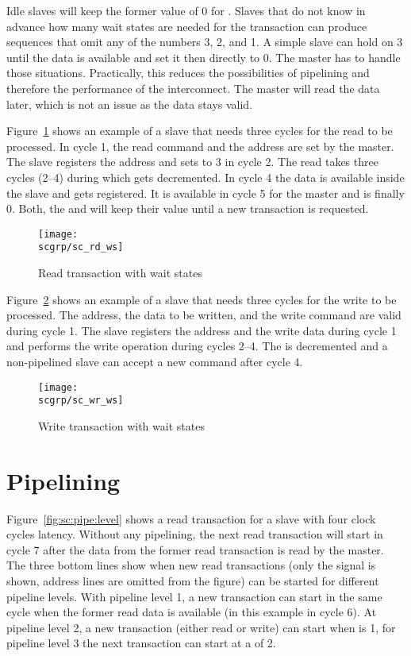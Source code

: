 Idle slaves will keep the former value of 0 for .
Slaves that do not know in advance how many wait states are needed
for the transaction can produce sequences that omit any of the
numbers 3, 2, and 1. A simple slave can hold  on 3
until the data is available and set it then directly to 0. The master
has to handle those situations. Practically, this reduces the
possibilities of pipelining and therefore the performance of the
interconnect. The master will read the data later, which is not an
issue as the data stays valid.

Figure~\ref{fig:sc:rd:ws} shows an example of a slave that needs
three cycles for the read to be processed. In cycle 1, the read
command and the address are set by the master. The slave registers
the address and sets  to 3 in cycle 2. The read takes
three cycles (2--4) during which  gets decremented. In
cycle 4 the data is available inside the slave and gets registered.
It is available in cycle 5 for the master and  is
finally 0. Both, the  and  will keep
their value until a new transaction is requested.

\begin{figure}
    \centering
    \texttt{[image: \\scgrp/sc\_rd\_ws]}
    \caption{Read transaction with wait states}
    \label{fig:sc:rd:ws}
\end{figure}


Figure~\ref{fig:sc:wr:ws} shows an example of a slave that needs
three cycles for the write to be processed. The address, the data to
be written, and the write command are valid during cycle 1. The slave
registers the address and the write data during cycle 1 and performs
the write operation during cycles 2--4. The  is
decremented and a non-pipelined slave can accept a new command after
cycle 4.

\begin{figure}
    \centering
    \texttt{[image: \\scgrp/sc\_wr\_ws]}
    \caption{Write transaction with wait states}
    \label{fig:sc:wr:ws}
\end{figure}



\section{Pipelining}

Figure~\ref{fig:sc:pipe:level} shows a read transaction for a slave
with four clock cycles latency. Without any pipelining, the next read
transaction will start in cycle 7 after the data from the former read
transaction is read by the master. The three bottom lines show when
new read transactions (only the  signal is shown, address
lines are omitted from the figure) can be started for different
pipeline levels. With pipeline level 1, a new transaction can start
in the same cycle when the former read data is available (in this
example in cycle 6). At pipeline level 2, a new transaction (either
read or write) can start when  is 1, for pipeline
level 3 the next transaction can start at a  of 2.

